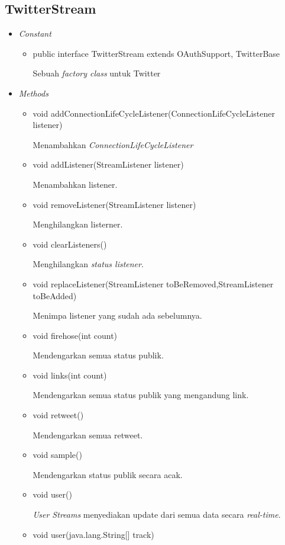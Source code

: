 	\subsection{TwitterStream}
	\begin{itemize}
		\item \textit{Constant}
		
		\begin{itemize}
			\item public interface TwitterStream
			extends OAuthSupport, TwitterBase
			
			Sebuah \textit{factory class} untuk Twitter
		\end{itemize}
		
		\item \textit{Methods}
		
		\begin{itemize}
			\item void addConnectionLifeCycleListener(ConnectionLifeCycleListener listener)
			
			Menambahkan \textit{ConnectionLifeCycleListener}
			\item void addListener(StreamListener listener)
			
			Menambahkan listener.
			\item void removeListener(StreamListener listener)
			
			Menghilangkan listerner.
			\item void clearListeners()
			
			Menghilangkan \textit{status listener}.
			\item void replaceListener(StreamListener toBeRemoved,StreamListener toBeAdded)
			
			Menimpa listener yang sudah ada sebelumnya.
			\item void firehose(int count)
			
			Mendengarkan semua status publik.
			\item void links(int count)
			
			Mendengarkan semua status publik yang mengandung link.
			\item void retweet()
			
			Mendengarkan semua retweet.
			\item void sample()
			
			Mendengarkan status publik secara acak.
			\item void user()
			
			\textit{User Streams} menyediakan update dari semua data secara \textit{real-time}.
			\item void user(java.lang.String[] track)
			

\end{itemize}
\end{itemize}

